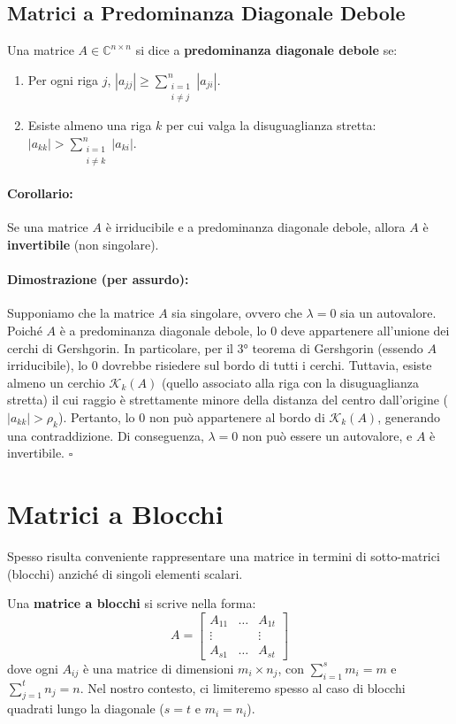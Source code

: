 \documentclass[a4paper,12pt]{article}
\begin{document}
	\subsection{Matrici a Predominanza Diagonale Debole}
	Una matrice $A \in \mathbb{C}^{n \times n}$ si dice a \textbf{predominanza diagonale debole} se:
	\begin{enumerate}
		\item Per ogni riga $j$, $|a_{jj}| \ge \sum_{\substack{i=1 \\ i \neq j}}^{n} |a_{ji}|$.
		\item Esiste almeno una riga $k$ per cui valga la disuguaglianza stretta: $|a_{kk}| > \sum_{\substack{i=1 \\ i \neq k}}^{n} |a_{ki}|$.
	\end{enumerate}
	
	\paragraph{Corollario:} Se una matrice $A$ è irriducibile e a predominanza diagonale debole, allora $A$ è \textbf{invertibile} (non singolare).
	
	\paragraph{Dimostrazione (per assurdo):}
	Supponiamo che la matrice $A$ sia singolare, ovvero che $\lambda = 0$ sia un autovalore. Poiché $A$ è a predominanza diagonale debole, lo $0$ deve appartenere all'unione dei cerchi di Gershgorin. In particolare, per il 3° teorema di Gershgorin (essendo $A$ irriducibile), lo $0$ dovrebbe risiedere sul bordo di tutti i cerchi. Tuttavia, esiste almeno un cerchio $\mathcal{K}_k(A)$ (quello associato alla riga con la disuguaglianza stretta) il cui raggio è strettamente minore della distanza del centro dall'origine ($|a_{kk}| > \rho_k$). Pertanto, lo $0$ non può appartenere al bordo di $\mathcal{K}_k(A)$, generando una contraddizione. Di conseguenza, $\lambda = 0$ non può essere un autovalore, e $A$ è invertibile. $\square$
	
	\section{Matrici a Blocchi}
	Spesso risulta conveniente rappresentare una matrice in termini di sotto-matrici (blocchi) anziché di singoli elementi scalari. 
	
	Una \textbf{matrice a blocchi} si scrive nella forma:
	\begin{equation}
		A = \begin{bmatrix} A_{11} & \dots & A_{1t} \\ \vdots & & \vdots \\ A_{s1} & \dots & A_{st} \end{bmatrix}
	\end{equation}
	dove ogni $A_{ij}$ è una matrice di dimensioni $m_i \times n_j$, con $\sum_{i=1}^{s} m_i = m$ e $\sum_{j=1}^{t} n_j = n$. Nel nostro contesto, ci limiteremo spesso al caso di blocchi quadrati lungo la diagonale ($s = t$ e $m_i = n_i$).
	
\end{document}
